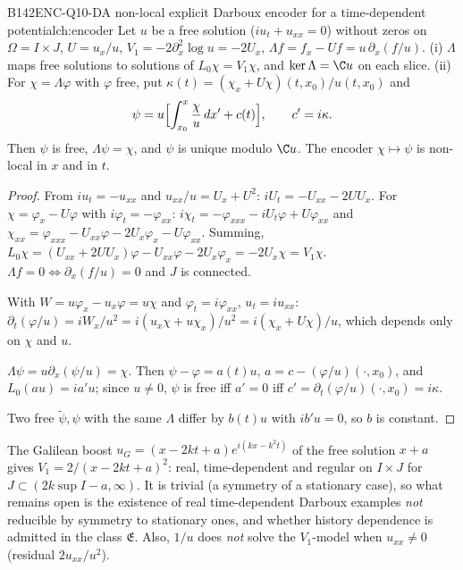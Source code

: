 \begin{dimcard}{B142}{ENC-Q10-D}{A non-local explicit Darboux encoder for a time-dependent potential}{\pw}{ch:encoder}
Let $u$ be a free solution ($iu_t+u_{xx}=0$) without zeros on $\Omega=I\times J$, $U=u_x/u$, $V_1=-2\partial_x^2\log u=-2U_x$, $\Lambda f=f_x-Uf=u\,\partial_x(f/u)$. (i) $\Lambda$ maps free solutions to solutions of $L_0\chi=V_1\chi$, and $\ker\Lambda=\C u$ on each slice. (ii) For $\chi=\Lambda\varphi$ with $\varphi$ free, put $\kappa(t)=(\chi_x+U\chi)(t,x_0)/u(t,x_0)$ and
\[
\psi=u\Bigl[\int_{x_0}^{x}\frac{\chi}{u}\,dx'+c(t)\Bigr],\qquad c'=i\kappa.
\]
Then $\psi$ is free, $\Lambda\psi=\chi$, and $\psi$ is unique modulo $\C u$. The encoder $\chi\mapsto\psi$ is non-local in $x$ and in $t$.
\end{dimcard}

\begin{proof}
From $iu_t=-u_{xx}$ and $u_{xx}/u=U_x+U^2$: $iU_t=-U_{xx}-2UU_x$. For $\chi=\varphi_x-U\varphi$ with $i\varphi_t=-\varphi_{xx}$: $i\chi_t=-\varphi_{xxx}-iU_t\varphi+U\varphi_{xx}$ and $\chi_{xx}=\varphi_{xxx}-U_{xx}\varphi-2U_x\varphi_x-U\varphi_{xx}$. Summing, $L_0\chi=(U_{xx}+2UU_x)\varphi-U_{xx}\varphi-2U_x\varphi_x=-2U_x\chi=V_1\chi$. $\Lambda f=0\iff\partial_x(f/u)=0$ and $J$ is connected.

With $W=u\varphi_x-u_x\varphi=u\chi$ and $\varphi_t=i\varphi_{xx}$, $u_t=iu_{xx}$: $\partial_t(\varphi/u)=iW_x/u^2=i(u_x\chi+u\chi_x)/u^2=i(\chi_x+U\chi)/u$, which depends only on $\chi$ and $u$.

$\Lambda\psi=u\partial_x(\psi/u)=\chi$. Then $\psi-\varphi=a(t)u$, $a=c-(\varphi/u)(\cdot,x_0)$, and $L_0(au)=ia'u$; since $u\ne0$, $\psi$ is free iff $a'=0$ iff $c'=\partial_t(\varphi/u)(\cdot,x_0)=i\kappa$.

Two free $\tilde\psi,\psi$ with the same $\Lambda$ differ by $b(t)u$ with $ib'u=0$, so $b$ is constant.

\end{proof}

\begin{caution}[title={A real, regular, time-dependent case and what stays open}]
The Galilean boost $u_G=(x-2kt+a)e^{i(kx-k^2t)}$ of the free solution $x+a$ gives $V_1=2/(x-2kt+a)^2$: real, time-dependent and regular on $I\times J$ for $J\subset(2k\sup I-a,\infty)$. It is trivial (a symmetry of a stationary case), so what remains open is the existence of real time-dependent Darboux examples \emph{not} reducible by symmetry to stationary ones, and whether history dependence is admitted in the class $\mathfrak E$. Also, $1/u$ does \emph{not} solve the $V_1$-model when $u_{xx}\ne0$ (residual $2u_{xx}/u^2$).
\end{caution}

